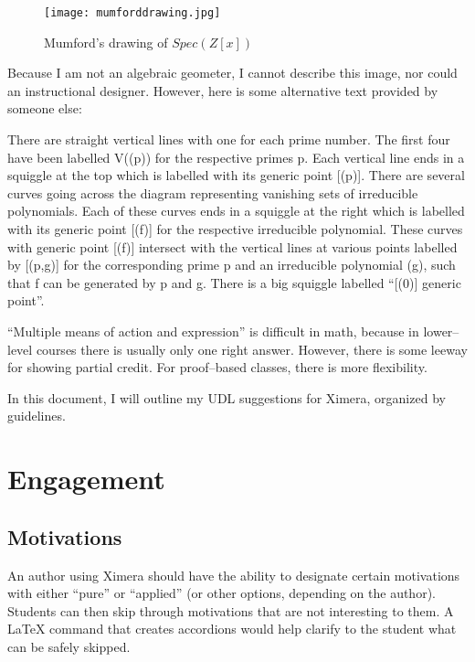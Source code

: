 \documentclass{ximera}
\begin{document}
\begin{figure}
\texttt{[image: mumforddrawing.jpg]}
\caption{Mumford's drawing of \( Spec(Z[x]) \) }
\end{figure}

Because I am not an algebraic geometer, I cannot describe this image, nor could an instructional designer. However, here is some alternative text provided 
by someone else:

\begin{blockquote}
There are straight vertical lines with one for each prime number. The first four have been labelled V((p)) for the respective primes p. Each vertical line ends in a squiggle at the top which is labelled with its generic point [(p)].
There are several curves going across the diagram representing vanishing sets of irreducible polynomials. Each of these curves ends in a squiggle at the right which is labelled with its generic point [(f)] for the respective irreducible polynomial.
These curves with generic point [(f)] intersect with the vertical lines at various points labelled by [(p,g)] for the corresponding prime p and an irreducible polynomial (g), such that f can be generated by p and g.
There is a big squiggle labelled ``[(0)] generic point''.
\end{blockquote}

``Multiple means of action and expression'' is difficult in math, because in lower--level courses there is usually only one right answer. However, 
there is some leeway for showing partial credit. For proof--based classes, there is more flexibility. 

In this document, I will outline my UDL suggestions for Ximera, organized by guidelines. 

\section{Engagement}

\subsection{Motivations}

An author using Ximera should have the ability to designate certain motivations with either ``pure''
or ``applied'' (or other options, depending on the author). Students can then skip through motivations
that are not interesting to them. A LaTeX command that creates accordions would help clarify to the 
student what can be safely skipped. 
\end{document}
